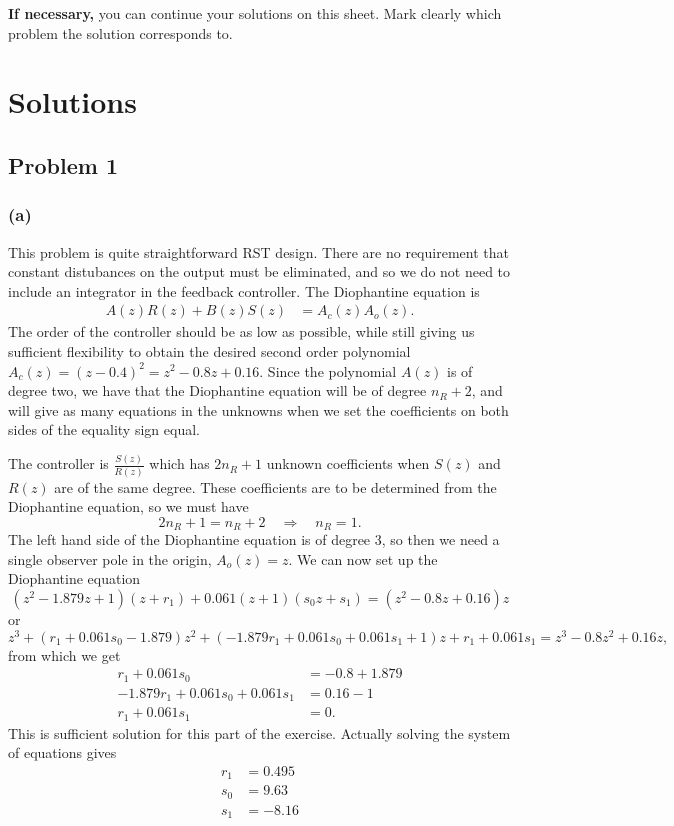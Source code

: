 \documentclass[letterpaper,12pt]{article}
\begin{document}
\cleardoublepage

\noindent
{\bf If necessary,} you can continue your solutions on this sheet. Mark clearly which problem the solution corresponds to.


\section*{Solutions}
\subsection*{Problem 1}

\subsubsection*{(a)}
This problem is quite straightforward RST design. There are no requirement that constant distubances on the output must be eliminated, and so we do not need to include an integrator in the feedback controller. The Diophantine equation is 
\begin{align*}
A(z) R(z) + B(z) S(z) &= A_c(z)A_o(z).
\end{align*}
The order of the controller should be as low as possible, while still giving us sufficient flexibility to obtain the desired second order polynomial $A_c(z)=(z-0.4)^2 = z^2 - 0.8z + 0.16$. Since the polynomial $A(z)$ is of degree two, we have that the Diophantine equation will be of degree $n_R + 2$, and will give as many equations in the unknowns when we set the coefficients on both sides of the equality sign equal. 

The controller is \(\frac{S(z)}{R(z)}\) which has \(2n_R + 1\) unknown coefficients when $S(z)$ and $R(z)$ are of the same degree. These coefficients are to be determined from the Diophantine equation, so we must have
\[ 2n_R + 1 = n_R + 2 \quad \Rightarrow \quad n_R = 1. \]
The left hand side of the Diophantine equation is of degree 3, so then we need a single observer pole in the origin, $A_o(z)=z$. 
We can now set up the Diophantine equation
\[ (z^2 - 1.879z + 1)(z+r_1) + 0.061(z + 1)(s_0z + s_1) = (z^2 - 0.8z + 0.16)z\]
or
\[ z^3 + (r_1 + 0.061s_0 - 1.879)z^2 + (- 1.879r_1 + 0.061s_0 + 0.061s_1 + 1)z + r_1 + 0.061s_1 = z^3 - 0.8z^2 + 0.16z,\]  
from which we get
\begin{align*}
 r_1 + 0.061s_0 &= -0.8+1.879\\
-1.879r_1 + 0.061s_0 + 0.061s_1 &= 0.16-1\\
r_1 + 0.061s_1 &= 0.
\end{align*}
This is sufficient solution for this part of the exercise. Actually solving the system of equations gives
\begin{align*}
r_1 &= 0.495\\
s_0 &= 9.63\\
s_1 &= -8.16
\end{align*}
\end{document}
